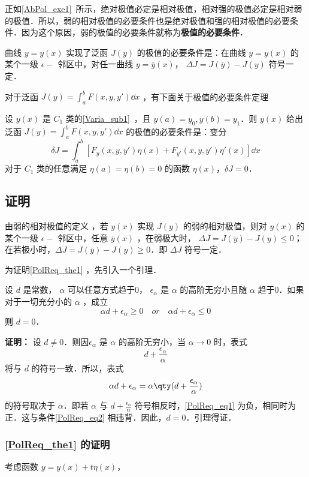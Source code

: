 
正如\autoref{AbPol_exe1}~所示，绝对极值必定是相对极值，相对强的极值必定是相对弱的极值．所以，弱的相对极值的必要条件也是绝对极值和强的相对极值的必要条件．因为这个原因，弱的极值的必要条件就称为\textbf{极值的必要条件}．

曲线 $y=y(x)$ 实现了泛函 $J(y)$ 的极值的必要条件是：在曲线 $y=y(x)$ 的某个一级 $\epsilon-$ 邻区中，对任一曲线 $y=\overline{y}(x)$， $\Delta J=J(\overline{y})-J(y)$ 符号一定．

对于泛函 $J(y)=\int_a^bF(x,y,y')\dd x$ ，有下面关于极值的必要条件定理
\begin{theorem}{}\label{PolReq_the1}
设 $y(x)$ 是 $C_1$ 类的\autoref{Varia_sub1}~，且 $y(a)=y_0,y(b)=y_1$．则 $y(x)$ 给出泛函 $J(y)=\int_a^bF(x,y,y')\dd x$ 的极值的必要条件是：变分
\begin{equation}
\delta J=\int_a^b[F_y(x,y,y')\eta(x)+F_{y'}(x,y,y')\eta'(x)]\dd x
\end{equation}
对于 $C_1$ 类的任意满足 $\eta(a)=\eta(b)=0$ 的函数 $\eta(x)$，$\delta J=0$．
\end{theorem}
\subsection{证明}
由弱的相对极值的定义 ，若 $y(x)$ 实现 $J(y)$ 的弱的相对极值，则对 $y(x)$ 的某个一级 $\epsilon-$ 邻区中，任意 $\overline{y}(x)$ ，在弱极大时， $\Delta J=J(\overline{y})-J(y)\leq 0$；在若极小时，$\Delta J=J(\overline{y})-J(y)\geq 0$．即 $\Delta J$ 符号一定．

为证明\autoref{PolReq_the1} ，先引入一个引理．
\begin{lemma}{}
设 $d$ 是常数， $\alpha$ 可以任意方式趋于0， $\epsilon_\alpha$ 是 $\alpha$ 的高阶无穷小且随 $\alpha$ 趋于0．如果对于一切充分小的 $\alpha$ ，成立 
\begin{equation}\label{PolReq_eq2}
\alpha d+\epsilon_\alpha\geq0\quad or\quad\alpha d+\epsilon_\alpha\leq0
\end{equation}
则 $d=0$．
\end{lemma}
\textbf{证明：} 设 $d\neq 0$．则因$\epsilon_\alpha$ 是 $\alpha$ 的高阶无穷小，当 $\alpha\rightarrow0$ 时，表式
\begin{equation}
d+\frac{\epsilon_\alpha}{\alpha}
\end{equation}
 将与 $d$ 的符号一致．所以，表式
 \begin{equation}\label{PolReq_eq1}
 \alpha d+\epsilon_\alpha=\alpha\qty(d+\frac{\epsilon_\alpha}{\alpha})
 \end{equation}
 的符号取决于 $\alpha$．即若 $\alpha$ 与 $d+\frac{\epsilon_\alpha}{\alpha}$ 符号相反时，\autoref{PolReq_eq1} 为负，相同时为正．这与条件\autoref{PolReq_eq2} 相违背．因此，$d=0$．引理得证．
 \subsubsection{\autoref{PolReq_the1} 的证明}
考虑函数 $y=y(x)+t\eta(x)$，